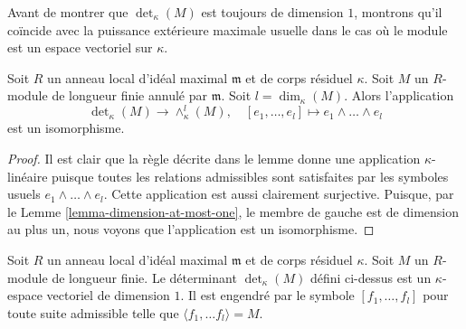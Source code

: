 \noindent
Avant de montrer que $\det_\kappa(M)$ est toujours de dimension $1$,
montrons qu'il coïncide avec la puissance extérieure maximale usuelle dans
le cas où le module est un espace vectoriel sur $\kappa$.

\begin{lemma}
\label{lemma-compare-det}
Soit $R$ un anneau local d'idéal maximal $\mathfrak m$ et de
corps résiduel $\kappa$. Soit $M$ un $R$-module de longueur finie
annulé par $\mathfrak m$. Soit $l = \dim_\kappa(M)$.
Alors l'application
$$
\det\nolimits_\kappa(M) \longrightarrow \wedge^l_\kappa(M),
\quad
[e_1, \ldots, e_l] \longmapsto e_1 \wedge \ldots \wedge e_l
$$
est un isomorphisme.
\end{lemma}

\begin{proof}
Il est clair que la règle décrite dans le lemme donne une application $\kappa$-linéaire
puisque toutes les relations admissibles sont satisfaites par les
symboles usuels $e_1 \wedge \ldots \wedge e_l$. Cette application est aussi clairement
surjective. Puisque, par le Lemme \ref{lemma-dimension-at-most-one}, le membre de gauche
est de dimension au plus un,
nous voyons que l'application est un isomorphisme.
\end{proof}

\begin{lemma}
\label{lemma-determinant-dimension-one}
Soit $R$ un anneau local d'idéal maximal $\mathfrak m$ et de
corps résiduel $\kappa$. Soit $M$ un $R$-module de longueur finie.
Le déterminant $\det_\kappa(M)$ défini ci-dessus est un $\kappa$-espace vectoriel
de dimension $1$. Il est engendré par le symbole
$[f_1, \ldots, f_l]$ pour toute suite admissible telle
que $\langle f_1, \ldots f_l \rangle = M$.
\end{lemma}


